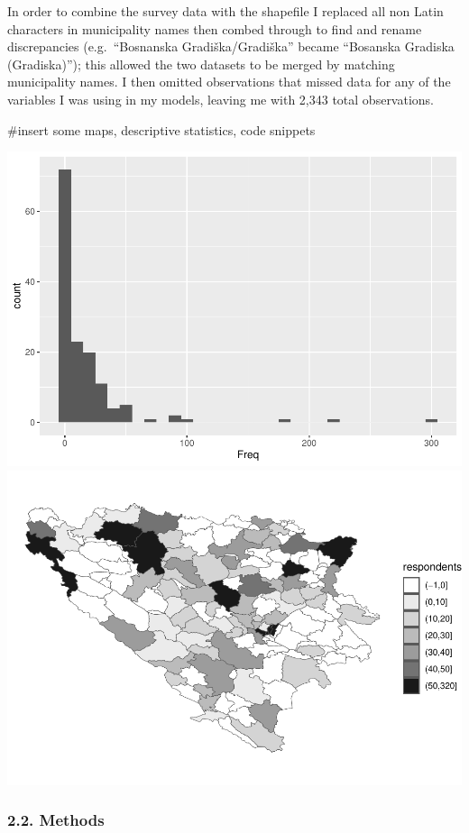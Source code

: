 \documentclass[
]{article}
\begin{document}
In order to combine the survey data with the shapefile I replaced all
non Latin characters in municipality names then combed through to find
and rename discrepancies (e.g.~``Bosnanska Gradiška/Gradiška'' became
``Bosanska Gradiska (Gradiska)''); this allowed the two datasets to be
merged by matching municipality names. I then omitted observations that
missed data for any of the variables I was using in my models, leaving
me with 2,343 total observations.

\#insert some maps, descriptive statistics, code snippets

\includegraphics{SMI205_Assessment2_Template_files/figure-latex/distributions plots-1.pdf}
\includegraphics{SMI205_Assessment2_Template_files/figure-latex/distributions plots-2.pdf}

\hypertarget{methods}{%
\subsubsection{2.2. Methods}\label{methods}}
\end{document}
